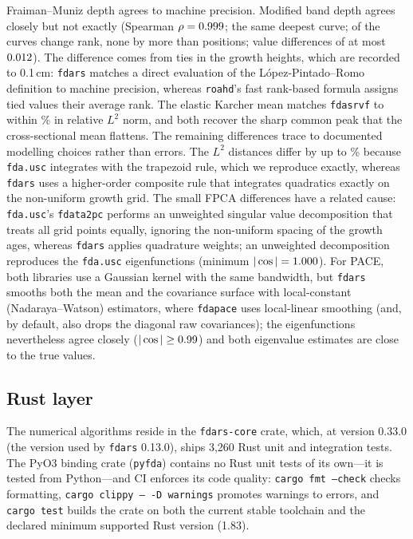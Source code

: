 Fraiman--Muniz depth agrees to machine precision.  Modified band depth
agrees closely but not exactly (Spearman $\rho=0.999$; the
same deepest curve; \ciMbdMoved{} of the \ciMbdN{} curves change rank, none by
more than \ciMbdMaxShift{} positions; value differences of at most
$0.012$).  The difference comes from ties in the growth heights, which
are recorded to 0.1\,cm: \texttt{fdars} matches a direct evaluation of the
L\'opez-Pintado--Romo definition to machine precision, whereas
\texttt{roahd}'s fast rank-based formula assigns tied values their average
rank.  The
elastic Karcher mean matches \texttt{fdasrvf} to within \ciKarcherRel\% in relative
$L^2$ norm, and both recover the sharp common peak that the cross-sectional
mean flattens.  The remaining differences trace to documented modelling
choices rather than errors.  The $L^2$ distances differ by up to \ciLtwoMaxRel\% because
\texttt{fda.usc} integrates with the trapezoid rule, which we reproduce
exactly, whereas \texttt{fdars} uses a higher-order composite rule that
integrates quadratics exactly on the non-uniform growth grid.  The small FPCA
differences have a related cause: \texttt{fda.usc}'s \texttt{fdata2pc}
performs an unweighted singular value decomposition that treats all grid
points equally, ignoring the non-uniform spacing of the growth ages, whereas
\texttt{fdars} applies quadrature weights; an unweighted decomposition
reproduces the \texttt{fda.usc} eigenfunctions (minimum
$|\cos| = 1.000$).  For PACE, both
libraries use a Gaussian kernel with the same bandwidth, but \texttt{fdars}
smooths both the mean and the covariance surface with local-constant
(Nadaraya--Watson) estimators, where \texttt{fdapace} uses local-linear
smoothing (and, by default, also drops the diagonal raw covariances); the eigenfunctions nevertheless
agree closely ($|\cos| \geq 0.99$) and both eigenvalue estimates are close to
the true values.

\subsection{Rust layer}

The numerical algorithms reside in the \texttt{fdars-core} crate, which, at
version 0.33.0 (the version used by \texttt{fdars} 0.13.0), ships
3{,}260 Rust unit and integration tests.  The PyO3 binding crate
(\texttt{pyfda}) contains no Rust unit tests of its own---it is tested from
Python---and CI enforces its code quality: \texttt{cargo fmt --check} checks
formatting, \texttt{cargo clippy -- -D warnings} promotes warnings to errors,
and \texttt{cargo test} builds the crate on both the current stable toolchain
and the declared minimum supported Rust version (1.83).

